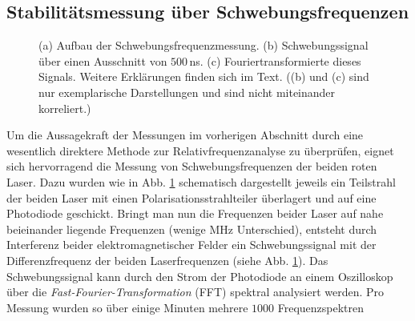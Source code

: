 \subsection{Stabilitätsmessung über
Schwebungsfrequenzen}\label{subsec:beatfrequenzmessung}
\begin{figure}[hp]
 	\centering
 	\footnotesize
	\caption[Beatfrequenzmessung]{(a) Aufbau der
	Schwebungsfrequenzmessung. (b) Schwebungssignal über einen
	Ausschnitt von $500\,$ns. (c) Fouriertransformierte dieses
	Signals. Weitere Erklärungen finden sich im Text. ((b) und (c) sind nur
	exemplarische Darstellungen und sind nicht miteinander korreliert.)}
	\label{fig:beatfrequenzmessung}
\end{figure}
Um die Aussagekraft der Messungen im vorherigen Abschnitt durch eine wesentlich
direktere Methode zur Relativfrequenzanalyse zu überprüfen, eignet sich hervorragend die
Messung von Schwebungsfrequenzen der beiden roten Laser. Dazu wurden wie in Abb.
\ref{fig:beatfrequenzmessung}
schematisch dargestellt jeweils ein Teilstrahl der beiden Laser mit einen Polarisationsstrahlteiler
überlagert und auf eine Photodiode geschickt. Bringt man nun die Frequenzen
beider Laser auf nahe beieinander liegende Frequenzen (wenige MHz
Unterschied), entsteht durch Interferenz beider
elektromagnetischer Felder ein Schwebungssignal mit der Differenzfrequenz der
beiden Laserfrequenzen (siehe Abb.
\ref{fig:beatfrequenzmessung}). Das
Schwebungssignal kann durch den Strom der Photodiode an einem Oszilloskop über
die \textit{Fast-Fourier-Transformation} (FFT) spektral analysiert werden. Pro
Messung wurden so über einige Minuten mehrere $1000$ Frequenzspektren
